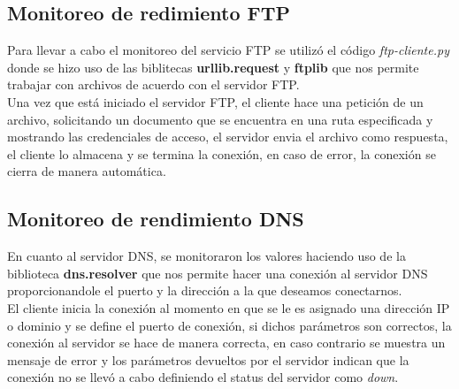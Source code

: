 \subsection{Monitoreo de redimiento FTP}
\noindent
Para llevar a cabo el monitoreo del servicio FTP se utilizó el código \textit{ftp-cliente.py} donde se hizo uso de las biblitecas \textbf{urllib.request} y \textbf{ftplib} que nos permite trabajar con archivos de acuerdo con el servidor FTP.\\
Una vez que está iniciado el servidor FTP, el cliente hace una petición de un archivo, solicitando un documento que se encuentra en una ruta especificada y mostrando las credenciales de acceso, el servidor envia el archivo como respuesta, el cliente lo almacena y se termina la conexión, en caso de error, la conexión se cierra de manera automática.
\subsection{Monitoreo de rendimiento DNS}
\noindent
En cuanto al servidor DNS, se monitoraron los valores haciendo uso de la biblioteca \textbf{dns.resolver} que nos permite hacer una conexión al servidor DNS proporcionandole el puerto y la dirección a la que deseamos conectarnos. \\
El cliente inicia la conexión al momento en que se le es asignado una dirección IP o dominio y se define el puerto de conexión, si dichos parámetros son correctos, la conexión al servidor se hace de manera correcta, en caso contrario se muestra un mensaje de error y los parámetros devueltos por el servidor indican que la conexión no se llevó a cabo definiendo el status del servidor como \textit{down}.

